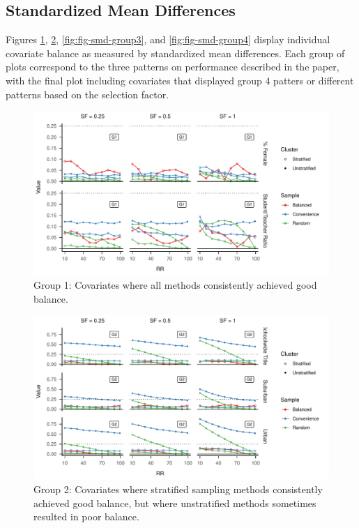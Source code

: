 \documentclass[
  english,
  man,floatsintext]{apa6}
\begin{document}
\hypertarget{SMD-results}{%
\subsection{Standardized Mean Differences}\label{SMD-results}}

Figures \ref{fig:fig-smd-group1}, \ref{fig:fig-smd-group2}, \ref{fig:fig-smd-group3}, and \ref{fig:fig-smd-group4} display individual covariate balance as measured by standardized mean differences. Each group of plots correspond to the three patterns on performance described in the paper, with the final plot including covariates that displayed group 4 patters or different patterns based on the selection factor.



\begin{figure}
\centering
\includegraphics{6---Paper_files/figure-latex/fig-smd-group1-1.pdf}
\caption{\label{fig:fig-smd-group1}Group 1: Covariates where all methods consistently achieved good balance.}
\end{figure}



\begin{figure}
\centering
\includegraphics{6---Paper_files/figure-latex/fig-smd-group2-1.pdf}
\caption{\label{fig:fig-smd-group2}Group 2: Covariates where stratified sampling methods consistently achieved good balance, but where unstratified methods sometimes resulted in poor balance.}
\end{figure}
\end{document}
